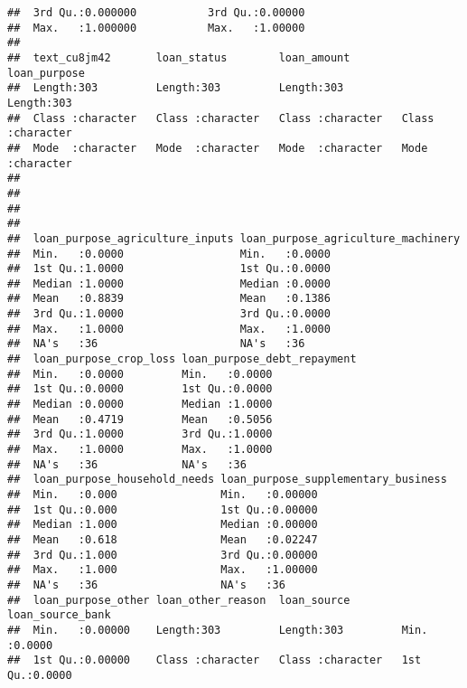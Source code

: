 \documentclass[
]{article}
\begin{document}
\begin{verbatim}
##  3rd Qu.:0.000000           3rd Qu.:0.00000                       
##  Max.   :1.000000           Max.   :1.00000                       
##                                                                   
##  text_cu8jm42       loan_status        loan_amount        loan_purpose      
##  Length:303         Length:303         Length:303         Length:303        
##  Class :character   Class :character   Class :character   Class :character  
##  Mode  :character   Mode  :character   Mode  :character   Mode  :character  
##                                                                             
##                                                                             
##                                                                             
##                                                                             
##  loan_purpose_agriculture_inputs loan_purpose_agriculture_machinery
##  Min.   :0.0000                  Min.   :0.0000                    
##  1st Qu.:1.0000                  1st Qu.:0.0000                    
##  Median :1.0000                  Median :0.0000                    
##  Mean   :0.8839                  Mean   :0.1386                    
##  3rd Qu.:1.0000                  3rd Qu.:0.0000                    
##  Max.   :1.0000                  Max.   :1.0000                    
##  NA's   :36                      NA's   :36                        
##  loan_purpose_crop_loss loan_purpose_debt_repayment
##  Min.   :0.0000         Min.   :0.0000             
##  1st Qu.:0.0000         1st Qu.:0.0000             
##  Median :0.0000         Median :1.0000             
##  Mean   :0.4719         Mean   :0.5056             
##  3rd Qu.:1.0000         3rd Qu.:1.0000             
##  Max.   :1.0000         Max.   :1.0000             
##  NA's   :36             NA's   :36                 
##  loan_purpose_household_needs loan_purpose_supplementary_business
##  Min.   :0.000                Min.   :0.00000                    
##  1st Qu.:0.000                1st Qu.:0.00000                    
##  Median :1.000                Median :0.00000                    
##  Mean   :0.618                Mean   :0.02247                    
##  3rd Qu.:1.000                3rd Qu.:0.00000                    
##  Max.   :1.000                Max.   :1.00000                    
##  NA's   :36                   NA's   :36                         
##  loan_purpose_other loan_other_reason  loan_source        loan_source_bank
##  Min.   :0.00000    Length:303         Length:303         Min.   :0.0000  
##  1st Qu.:0.00000    Class :character   Class :character   1st Qu.:0.0000  

\end{verbatim}
\end{document}
